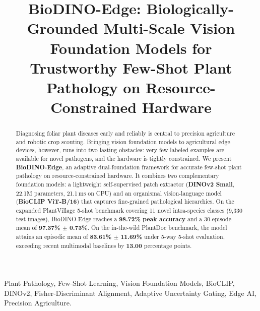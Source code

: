 \documentclass[conference]{IEEEtran}
\begin{document}
\title{BioDINO-Edge: Biologically-Grounded Multi-Scale Vision Foundation Models for Trustworthy Few-Shot Plant Pathology on Resource-Constrained Hardware}

\author{
    \and
}

\maketitle

\begin{abstract}
Diagnosing foliar plant diseases early and reliably is central to precision agriculture and robotic crop scouting. Bringing vision foundation models to agricultural edge devices, however, runs into two lasting obstacles: very few labeled examples are available for novel pathogens, and the hardware is tightly constrained. We present \textbf{BioDINO-Edge}, an adaptive dual-foundation framework for accurate few-shot plant pathology on resource-constrained hardware. It combines two complementary foundation models: a lightweight self-supervised patch extractor (\textbf{DINOv2 Small}, 22.1M parameters, 21.1\,ms on CPU) and an organismal vision-language model (\textbf{BioCLIP ViT-B/16}) that captures fine-grained pathological hierarchies. On the expanded PlantVillage 5-shot benchmark covering 11 novel intra-species classes (9,330 test images), BioDINO-Edge reaches a \textbf{98.72\% peak accuracy} and a 30-episode mean of \textbf{97.37\% $\pm$ 0.73\%}. On the in-the-wild PlantDoc benchmark, the model attains an episodic mean of \textbf{83.61\% $\pm$ 11.69\%} under 5-way 5-shot evaluation, exceeding recent multimodal baselines by \textbf{13.00} percentage points.
\end{abstract}

\begin{IEEEkeywords}
Plant Pathology, Few-Shot Learning, Vision Foundation Models, BioCLIP, DINOv2, Fisher-Discriminant Alignment, Adaptive Uncertainty Gating, Edge AI, Precision Agriculture.
\end{IEEEkeywords}
\end{document}
